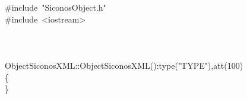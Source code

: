 {\ttfamily \raggedright \small
\#include\ "{}SiconosObject.h"{}\\
\#include\ <{}iostream>{}\\
\ \\
\ \\
\ \\
ObjectSiconosXML::ObjectSiconosXML():type("{}TYPE"{}),att(100)\\
\{\\
\}\\
\ \\
\ \\
 }
\normalfont\normalsize

